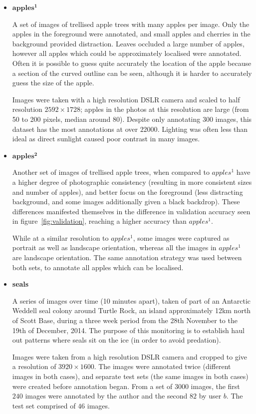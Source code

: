 \begin{itemize}
    \item{$\mathbf{apples^1}$}

A set of images of trellised apple trees with many apples per image. Only the apples in the foreground were annotated, and small apples and cherries in the background provided distraction. Leaves occluded a large number of apples, however all apples which could be approximately localised were annotated. Often it is possible to guess quite accurately the location of the apple because a section of the curved outline can be seen, although it is harder to accurately guess the size of the apple. 

Images were taken with a high resolution DSLR camera and scaled to half resolution $2592\times1728$; apples in the photos at this resolution are large (from 50 to 200 pixels, median around 80). Despite only annotating 300 images, this dataset has the most annotations at over $22000$. Lighting was often less than ideal as direct sunlight caused poor contrast in many images.
    
    \item{$\mathbf{apples^2}$}
    
Another set of images of trellised apple trees, when compared to \emph{$apples^1$} have a higher degree of  photographic consistency (resulting in more consistent sizes and number of apples), and better focus on the foreground (less distracting background, and some images additionally given a black backdrop). These differences manifested themselves in the difference in validation accuracy seen in figure~\ref{fig:validation}, reaching a higher accuracy than \emph{$apples^1$}.

While at a similar resolution to \emph{$apples^1$}, some images were captured as portrait as well as landscape orientation, whereas all the images in \emph{$apples^1$} are landscape orientation. The same annotation strategy was used between both sets, to annotate all apples which can be localised.

    \item{\bf{seals}}
    
 A series of images over time (10 minutes apart), taken of part of an Antarctic Weddell seal colony around Turtle Rock, an island approximately 12km north of Scott Base, during a three week period from the 28th November to the 19th of December, 2014. The purpose of this monitoring is to establish haul out patterns where seals sit on the ice (in order to avoid predation).  

Images were taken from a high resolution DSLR camera and cropped to give a resolution of $3920\times1600$. The images were annotated twice (different images in both cases), and separate test sets (the same images in both cases) were  created before annotation began. From a set of $3000$ images, the first $240$ images were annotated by the author and the second $82$ by user $b$. The test set comprised of $46$ images.


\end{itemize}
